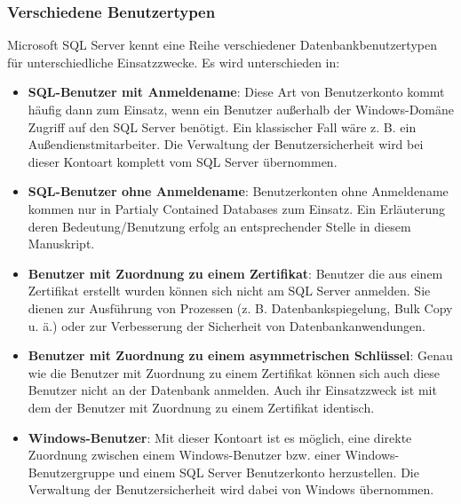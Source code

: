           \subsubsection{Verschiedene Benutzertypen}
            Microsoft SQL Server kennt eine Reihe verschiedener
            Datenbankbenutzertypen für unterschiedliche Einsatzzwecke. Es wird
            unterschieden in:
            \begin{itemize}
                \item \textbf{SQL-Benutzer mit Anmeldename}: Diese Art von
                Benutzerkonto kommt häufig dann zum Einsatz, wenn ein Benutzer
                außerhalb der Windows-Domäne Zugriff auf den SQL Server
                benötigt. Ein klassischer Fall wäre z. B. ein
                Außendienstmitarbeiter. Die Verwaltung der Benutzersicherheit
                wird bei dieser Kontoart komplett vom SQL Server übernommen.
                \item \textbf{SQL-Benutzer ohne Anmeldename}: Benutzerkonten
                ohne Anmeldename kommen nur in Partialy Contained Databases zum
                Einsatz. Ein Erläuterung deren Bedeutung/Benutzung erfolg an
                entsprechender Stelle in diesem Manuskript.
                \item \textbf{Benutzer mit Zuordnung zu einem Zertifikat}:
                Benutzer die aus einem Zertifikat erstellt wurden können sich
                nicht am SQL Server anmelden. Sie dienen zur Ausführung von
                Prozessen (z. B. Datenbankspiegelung, Bulk Copy u. ä.) oder zur
                Verbesserung der Sicherheit von Datenbankanwendungen.
                \item \textbf{Benutzer mit Zuordnung zu einem asymmetrischen
                Schlüssel}: Genau wie die Benutzer mit Zuordnung zu einem
                Zertifikat können sich auch diese Benutzer nicht an der
                Datenbank anmelden. Auch ihr Einsatzzweck ist mit dem der
                Benutzer mit Zuordnung zu einem Zertifikat identisch.
                \item \textbf{Windows-Benutzer}: Mit dieser Kontoart ist es
                möglich, eine direkte Zuordnung zwischen einem Windows-Benutzer
                bzw. einer Windows-Benutzergruppe und einem SQL Server
                Benutzerkonto herzustellen. Die Verwaltung der
                Benutzersicherheit wird dabei von Windows übernommen.
            \end{itemize}
            \begin{literaturinternet}
              \item \cite{bb895327}
              \item \cite{somarskoggranperm}
            \end{literaturinternet}
